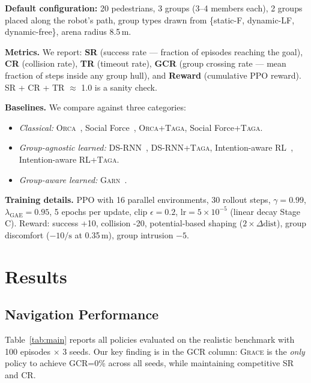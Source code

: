 \documentclass{article}
\newcommand{\grace}{\textsc{Grace}}
\newcommand{\garn}{\textsc{Garn}}
\newcommand{\taga}{\textsc{Taga}}
\newcommand{\orca}{\textsc{Orca}}
\begin{document}
\textbf{Default configuration:} 20 pedestrians, 3 groups (3--4 members each),
2 groups placed along the robot's path, group types drawn from
\{static-F, dynamic-LF, dynamic-free\}, arena radius 8.5\,m.

\textbf{Metrics.}
We report: \textbf{SR} (success rate — fraction of episodes reaching the goal),
\textbf{CR} (collision rate), \textbf{TR} (timeout rate),
\textbf{GCR} (group crossing rate — mean fraction of steps inside any group hull),
and \textbf{Reward} (cumulative PPO reward).
SR + CR + TR $\approx$ 1.0 is a sanity check.

\textbf{Baselines.}
We compare against three categories:
\begin{itemize}\setlength\itemsep{0pt}
  \item \textit{Classical:} \orca{}~\citep{vandenberg2011reciprocal},
        Social Force~\citep{helbing1995social},
        \orca{}+\taga{}, Social Force+\taga{}.
  \item \textit{Group-agnostic learned:} DS-RNN~\citep{liu2021decentralized},
        DS-RNN+\taga{}, Intention-aware RL~\citep{liu2022intention},
        Intention-aware RL+\taga{}.
  \item \textit{Group-aware learned:} \garn{}~\citep{lu2025garn}.
\end{itemize}

\textbf{Training details.}
PPO with 16 parallel environments, 30 rollout steps,
$\gamma=0.99$, $\lambda_\text{GAE}=0.95$, 5 epochs per update,
clip $\epsilon=0.2$, $\text{lr}=5\times 10^{-5}$ (linear decay Stage C).
Reward: success +10, collision -20, potential-based shaping
($2 \times \Delta\text{dist}$), group discomfort ($-10/\text{s}$ at 0.35\,m), group intrusion $-5$.

\section{Results}
\label{sec:results}

\subsection{Navigation Performance}
\label{sec:nav_results}

Table~\ref{tab:main} reports all policies evaluated on the realistic benchmark
with 100 episodes $\times$ 3 seeds. Our key finding is in the GCR column:
\grace{} is the \emph{only} policy to achieve GCR=0\% across all seeds, while
maintaining competitive SR and CR.
\end{document}
